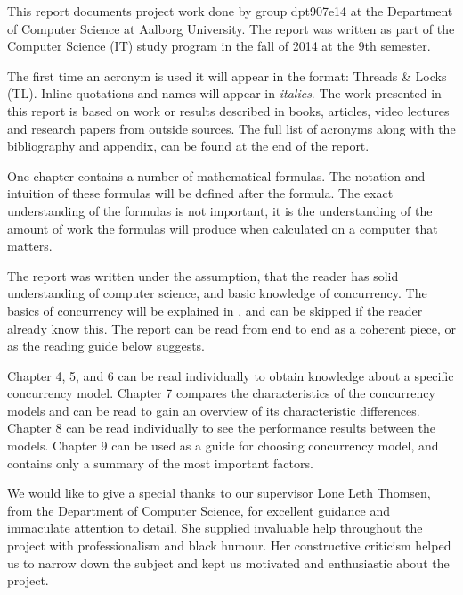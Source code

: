 \makeatletter {}\makeatother
{}
This report documents project work done by group dpt907e14 at the Department of Computer Science at Aalborg University. The report was written as part of the Computer Science (IT) study program in the fall of 2014 at the 9th semester.

The first time an acronym is used it will appear in the format: Threads \& Locks (TL). Inline quotations and names will appear in \textit{italics}. The work presented in this report is based on work or results described in books, articles, video lectures and research papers from outside sources. The full list of acronyms along with the bibliography and appendix, can be found at the end of the report.

One chapter contains a number of mathematical formulas. The notation and intuition of these formulas will be defined after the formula. The exact understanding of the formulas is not important, it is the understanding of the amount of work the formulas will produce when calculated on a computer that matters.

The report was written under the assumption, that the reader has solid understanding of computer science, and basic knowledge of concurrency. The basics of concurrency will be explained in , and can be skipped if the reader already know this. The report can be read from end to end as a coherent piece, or as the reading guide below suggests.

Chapter 4, 5, and 6 can be read individually to obtain knowledge about a specific concurrency model. Chapter 7 compares the characteristics of the concurrency models and can be read to gain an overview of its characteristic differences. Chapter 8 can be read individually to see the performance results between the models. Chapter 9 can be used as a guide for choosing concurrency model, and contains only a summary of the most important factors.

We would like to give a special thanks to our supervisor Lone Leth Thomsen, from the Department of Computer Science, for excellent guidance and immaculate attention to detail. She supplied invaluable help throughout the project with professionalism and black humour. Her constructive criticism helped us to narrow down the subject and kept us motivated and enthusiastic about the project.


